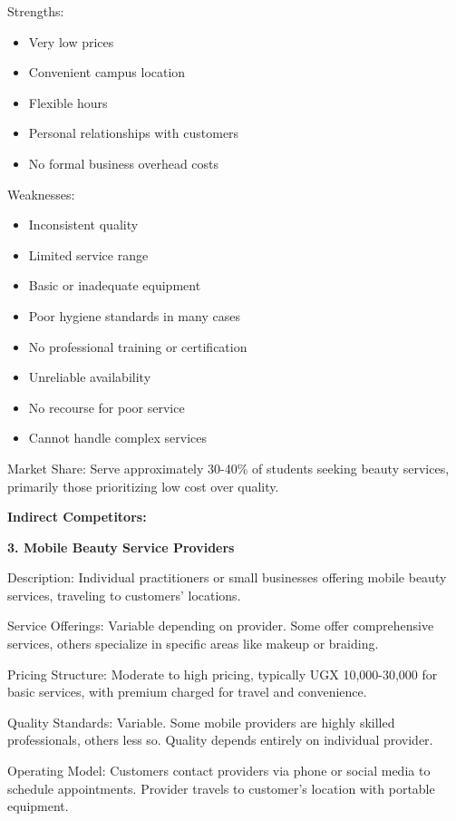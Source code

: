 \documentclass[a4paper,12pt]{article}
\begin{document}
Strengths:
\begin{itemize}[leftmargin=2em]
    \item Very low prices
    \item Convenient campus location
    \item Flexible hours
    \item Personal relationships with customers
    \item No formal business overhead costs
\end{itemize}

Weaknesses:
\begin{itemize}[leftmargin=2em]
    \item Inconsistent quality
    \item Limited service range
    \item Basic or inadequate equipment
    \item Poor hygiene standards in many cases
    \item No professional training or certification
    \item Unreliable availability
    \item No recourse for poor service
    \item Cannot handle complex services
\end{itemize}

Market Share: Serve approximately 30-40\% of students seeking beauty services, primarily those prioritizing low cost over quality.

\textbf{Indirect Competitors:}

\textbf{3. Mobile Beauty Service Providers}

Description: Individual practitioners or small businesses offering mobile beauty services, traveling to customers' locations.

Service Offerings: Variable depending on provider. Some offer comprehensive services, others specialize in specific areas like makeup or braiding.

Pricing Structure: Moderate to high pricing, typically UGX 10,000-30,000 for basic services, with premium charged for travel and convenience.

Quality Standards: Variable. Some mobile providers are highly skilled professionals, others less so. Quality depends entirely on individual provider.

Operating Model: Customers contact providers via phone or social media to schedule appointments. Provider travels to customer's location with portable equipment.
\end{document}
